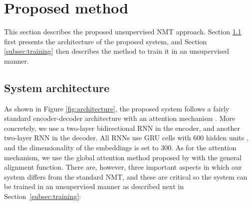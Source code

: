 \documentclass{article} \usepackage{iclr2018_conference,times}
\begin{document}
\section{Proposed method} 
\label{sec:method}

This section describes the proposed unsupervised NMT approach. Section \ref{subsec:architecture} first presents the architecture of the proposed system, and Section \ref{subsec:training} then describes the method to train it in an unsupervised manner.

\subsection{System architecture} 
\label{subsec:architecture}

As shown in Figure \ref{fig:architecture}, the proposed system follows a fairly standard encoder-decoder architecture with an attention mechanism \citep{bahdanau2014neural}. More concretely, we use a two-layer bidirectional RNN in the encoder, and another two-layer RNN in the decoder. All RNNs use GRU cells with 600 hidden units \citep{cho2014learning}, and the dimensionality of the embeddings is set to 300. As for the attention mechanism, we use the global attention method proposed by \citet{luong2015effective} with the general alignment function. There are, however, three important aspects in which our system differs from the standard NMT, and these are critical so the system can be trained in an unsupervised manner as described next in Section~\ref{subsec:training}:
\end{document}
